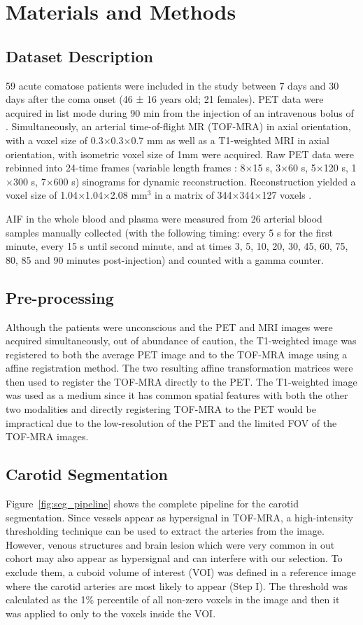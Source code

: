 \chapter{Materials and Methods}

\section{Dataset Description}
59 acute comatose patients were included in the study between 7 days and 30 days after the coma onset (46 ± 16 years old; 21 females).
PET data were acquired in list mode during 90 min from the injection of an intravenous bolus of \fdg.
Simultaneously, an arterial time-of-flight MR (TOF-MRA)  in axial orientation, with a voxel size of 0.3$\times$0.3$\times$0.7 mm as well as a T1-weighted MRI in axial orientation, with isometric voxel size of 1mm were acquired.
Raw PET data were rebinned into 24-time frames (variable length frames : 8$\times$15 s, 3$\times$60 s, 5$\times$120 s, 1$\times$300 s, 7$\times$600 s) sinograms for dynamic reconstruction.
Reconstruction yielded a voxel size of 1.04$\times$1.04$\times$2.08 mm$^3$ in a matrix of 344$\times$344$\times$127 voxels .

AIF in the whole blood and plasma were measured from 26 arterial blood samples manually collected (with the following timing: every 5 s for the first minute, every 15 s until second minute, and at times 3, 5, 10, 20, 30, 45, 60, 75, 80, 85 and 90 minutes post-injection) and counted with a gamma counter.

\section{Pre-processing}
Although the patients were unconscious and the PET and MRI images were acquired simultaneously, out of abundance of caution, the T1-weighted image was registered to both the average PET image and to the TOF-MRA image using a affine registration method. The two resulting affine transformation matrices were then used to register the TOF-MRA directly to the PET.
The T1-weighted image was used as a medium since it has common spatial features with both the other two modalities and directly registering TOF-MRA to the PET would be impractical due to the low-resolution of the PET and the limited FOV of the TOF-MRA images.

\section{Carotid Segmentation\label{sec:carotid}}
Figure~\ref{fig:seg_pipeline} shows the complete pipeline for the carotid segmentation.
Since vessels appear as hypersignal in TOF-MRA, a high-intensity thresholding technique can be used to extract the arteries from the image.
However, venous structures and brain lesion which were very common in out cohort may also appear as hypersignal and can interfere with our selection.
To exclude them, a cuboid volume of interest (VOI) was defined in a reference image where the carotid arteries are most likely to appear (Step I).
The threshold was calculated as the 1\% percentile of all non-zero voxels in the image and then it was applied to only to the voxels inside the VOI.

